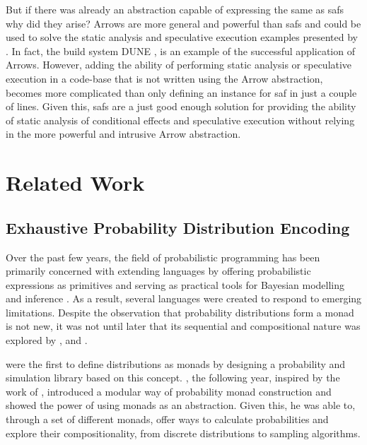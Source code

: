 \documentclass[
  oneside,
  11pt, a4paper,
  footinclude=true,
  headinclude=true,
  cleardoublepage=empty
]{scrbook}
\theoremstyle{definition}
\theoremstyle{definition}
\begin{document}
	But if there was already an abstraction capable of expressing the same as \glspl{saf} why did they arise? Arrows are more general and powerful than \glspl{saf} and could be used to solve the static analysis and speculative execution examples presented by \cite{andrey2019selective}. In fact, the build system DUNE \citep{dune_2018}, is an example of the successful application of Arrows. However, adding the ability of performing static analysis or speculative execution in a code-base that is not written using the Arrow abstraction, becomes more complicated than only defining an instance for \gls{saf} in just a couple of lines. Given this, \glspl{saf} are a just good enough solution for providing the ability of static analysis of conditional effects and speculative execution without relying in the more powerful and intrusive Arrow abstraction.
	            
	    \section{Related Work}\label{sec-related-work}
        
        \subsection{Exhaustive Probability Distribution Encoding}
        
    Over the past few years, the field of probabilistic programming has been primarily concerned with extending languages by offering probabilistic expressions as primitives and serving as practical tools for Bayesian modelling and inference \citep{erwig_kollmansberger_2006}. As a result, several languages were created to respond to emerging limitations. Despite the observation that probability distributions form a monad is not new, it was not until later that its sequential and compositional nature was explored by \cite{Ramsey:2002:SLC:565816.503288}, \cite{Goodman:2013:PPP:2480359.2429117} and \cite{Gordon:2013:MPB:2429069.2429119}.
        
        \cite{erwig_kollmansberger_2006} were the first to define distributions as monads by designing a probability and simulation library based on this concept. \cite{kidd2007build}, the following year, inspired by the work of \cite{Ramsey:2002:SLC:565816.503288}, introduced a modular way of probability monad construction and showed the power of using monads as an abstraction. Given this, he was able to, through a set of different monads, offer ways to calculate probabilities and explore their compositionality, from discrete distributions to sampling algorithms.
                
\end{document}
